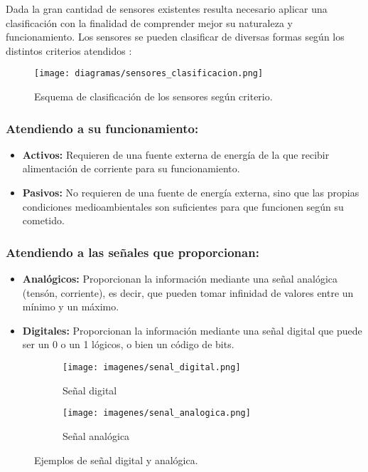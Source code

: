 Dada la gran cantidad de sensores existentes resulta necesario aplicar una clasificación con la finalidad de comprender mejor su naturaleza y funcionamiento. Los sensores se pueden 
clasificar de diversas formas según los distintos criterios atendidos \cite{book:guiapracticasensores}:\\

\begin{figure}[H]
  \begin{center}
    \texttt{[image: diagramas/sensores\_clasificacion.png]}
  \end{center}
  \label{fig:clasificacion_sensores}
 \caption{Esquema de clasificación de los sensores según criterio.}
\end{figure}

\subsubsection{Atendiendo a su funcionamiento:}
\begin{itemize}
 \item \textbf{Activos:} Requieren de una fuente externa de energía de la que recibir alimentación de corriente para su funcionamiento.
 \item \textbf{Pasivos:} No requieren de una fuente de energía externa, sino que las propias condiciones medioambientales son suficientes para que funcionen según su cometido.
\end{itemize}

\subsubsection{Atendiendo a las señales que proporcionan:}

\begin{itemize}
 \item \textbf{Analógicos:} Proporcionan la información mediante una señal analógica (tensón, corriente), es decir, que pueden tomar infinidad de valores entre un mínimo y
 un máximo.
 \item \textbf{Digitales:} Proporcionan la información mediante una señal digital que puede ser un 0 o un 1 lógicos, o bien un código de bits.
\end{itemize}

\begin{figure}[H]
    \centering
    \begin{subfigure}[b]{0.4\textwidth}
        \texttt{[image: imagenes/senal\_digital.png]}
        \caption{Señal digital}
        \label{fig:gull}
    \end{subfigure}
    \begin{subfigure}[b]{0.26\textwidth}
        \texttt{[image: imagenes/senal\_analogica.png]}
        \caption{Señal analógica}
        \label{fig:tiger}
    \end{subfigure}
    \caption{Ejemplos de señal digital y analógica.}\label{fig:animals}
\end{figure}

